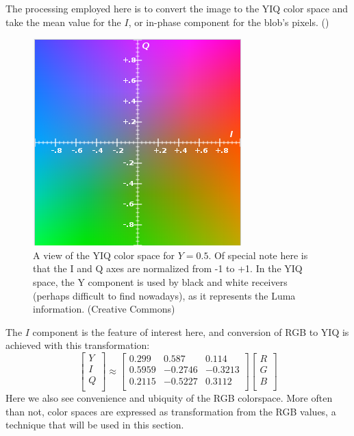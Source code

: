 \documentclass[letterpaper]{article}
\begin{document}
{The processing employed here is to convert the image to the YIQ color space and take the mean value for the $I$, or in-phase component for the blob's pixels. (\cite{MathWorks_undated-jg})
\begin{figure}[h!]
	\centering
	\includegraphics[scale=0.4]{./figures/yiq.png}
	\caption[YIQ color space at $Y = 0.5$]{A view of the YIQ color space for $Y=0.5$. Of special note here is that the I and Q axes are normalized from -1 to +1. In the YIQ space, the Y component is used by black and white receivers (perhaps difficult to find nowadays), as it represents the Luma information. (Creative Commons)}
	\label{fig:yiq}
\end{figure}
The $I$ component is the feature of interest here, and conversion of RGB to YIQ is achieved with this transformation:
\begin{equation}
	\begin{bmatrix}
	Y \\[0.3em]
	I \\[0.3em]
	Q \\[0.3em]
	\end{bmatrix}
	\approx
	\begin{bmatrix}
	0.299 & 0.587 & 0.114 \\[0.3em]
	0.5959 & -0.2746 & -0.3213\\[0.3em]
	0.2115 & -0.5227 & 0.3112 \\[0.3em]
	\end{bmatrix}
	\begin{bmatrix}
	R \\[0.3em]
	G \\[0.3em]
	B \\[0.3em]
	\end{bmatrix}	
\end{equation}
Here we also see convenience and ubiquity of the RGB colorspace. More often than not, color spaces are expressed as transformation from the RGB values, a technique that will be used in this section.

}
\end{document}
